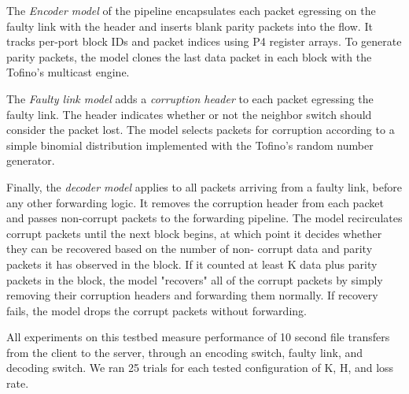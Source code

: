 The \emph{Encoder model} of the pipeline encapsulates each packet egressing on
the faulty link with the \OurSys header and inserts blank  parity packets into
the flow. It tracks per-port block IDs and  packet indices using P4 register
arrays. To generate parity packets, the  model clones the last data packet in
each block with the Tofino's multicast engine.

The \emph{Faulty link model} adds a \emph{corruption header} to each packet
egressing the faulty link. The header indicates whether or not the neighbor
switch should consider the packet lost. The model selects packets for
corruption according to a simple binomial distribution implemented with the
Tofino's random number generator.

Finally, the \emph{decoder model} applies to all packets arriving from a
faulty link, before any other forwarding logic. It removes the corruption
header from each packet and passes non-corrupt packets to the forwarding
pipeline. The model recirculates corrupt packets until the next block begins,
at which point it decides whether they can be recovered based on the number of
non- corrupt data and parity packets it has observed in the block. If it
counted at least K data plus parity packets  in the block, the model
"recovers" all of the corrupt packets by simply removing their corruption
headers and forwarding them normally. If recovery fails, the model drops the
corrupt packets without forwarding.

All experiments on this testbed measure performance of 10 second file
transfers from the  client to the server, through an encoding switch, faulty
link, and decoding switch. We ran 25 trials for each tested configuration of
K, H,  and loss rate.


